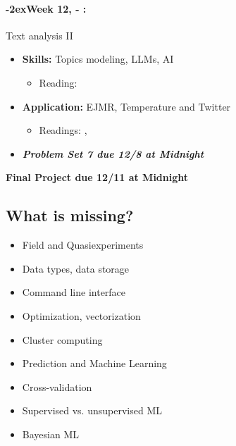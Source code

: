 \documentclass[11pt]{article}
\newcommand{\week}[1]{%
  \paragraph*{\kern-2ex\quad #1, \AdvanceDate[1]\syldate{\today} - \AdvanceDate[2]\syldate{\today}:}%
  \ifdim\wd1=\wd\MONDAY
    \AdvanceDate[7]
  \else
    \AdvanceDate[7]
  \fi%
}
\begin{document}
\week{Week 12} Text analysis II
\begin{itemize}
  \item \textbf{Skills:} Topics modeling, LLMs, AI
  \begin{itemize}
    \item Reading: \textbf{\cite{ash2023textalgorithms}}
  \end{itemize}
  \item \textbf{Application:} EJMR, Temperature and Twitter
  \begin{itemize}
    \item Readings: \textbf{\cite{wu2018gendered}}, \cite{moore2019temp}
  \end{itemize}
  \item \textit{\textbf{Problem Set 7 due 12/8 at Midnight}}
\end{itemize}

\textbf{Final Project due 12/11 at Midnight}

\subsection*{What is missing?}

\begin{itemize}
  \item Field and Quasiexperiments
  \item Data types, data storage
  \item Command line interface
  \item Optimization, vectorization
  \item Cluster computing
  \item Prediction and Machine Learning
  \item Cross-validation
  \item Supervised vs. unsupervised ML
  \item Bayesian ML
\end{itemize}

\newpage

%



\end{document}
